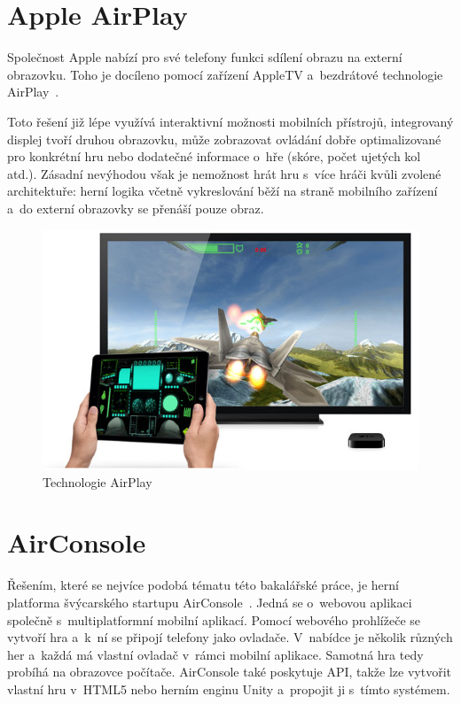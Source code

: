 \documentclass[thesis=B,czech,hidelinks]{FITthesis}[2012/06/26] %
\begin{document}
\section{Apple AirPlay}

Společnost Apple nabízí pro své telefony funkci sdílení obrazu na externí obrazovku. Toho je docíleno pomocí zařízení AppleTV a~bezdrátové technologie AirPlay~\cite{airplay}.

Toto řešení již lépe využívá interaktivní možnosti mobilních přístrojů, integrovaný displej tvoří druhou obrazovku, může zobrazovat ovládání dobře optimalizované pro konkrétní hru nebo dodatečné informace o~hře (skóre, počet ujetých kol atd.). Zásadní nevýhodou však je nemožnost hrát hru s~více hráči kvůli zvolené architektuře: herní logika včetně vykreslování běží na straně mobilního zařízení a~do externí obrazovky se přenáší pouze obraz.

\begin{figure}[h]
\includegraphics[width=\textwidth]{airplay}
\caption{Technologie AirPlay~\cite{airplay}}
\end{figure}


\section{AirConsole}

Řešením, které se nejvíce podobá tématu této bakalářské práce, je herní platforma švýcarského startupu AirConsole~\cite{airconsole}. Jedná se o~webovou aplikaci společně s~multiplatformní mobilní aplikací. Pomocí webového prohlížeče se vytvoří hra a~k~ní se připojí telefony jako ovladače. V~nabídce je několik různých her a~každá má vlastní ovladač v~rámci mobilní aplikace. Samotná hra tedy probíhá na obrazovce počítače. AirConsole také poskytuje API, takže lze vytvořit vlastní hru v~HTML5 nebo herním enginu Unity a~propojit ji s~tímto systémem.
\end{document}
